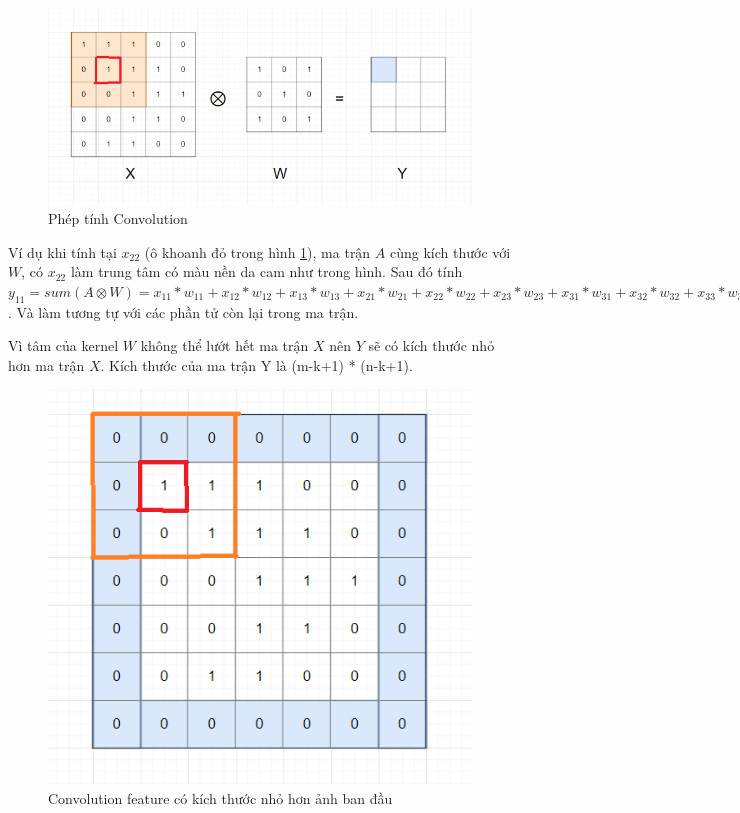 \FloatBarrier
\begin{figure}[htp]
\begin{center}
\includegraphics[scale=0.65]{chap2/c2_figs/9.png}
\end{center}
\caption{Phép tính Convolution}
\label{fig:convolution}
\end{figure}
\FloatBarrier

Ví dụ khi tính tại $x_{22}$ (ô khoanh đỏ trong hình \ref{fig:convolution}), ma trận $A$ cùng kích thước với $W$, có $x_{22}$ làm trung tâm có màu nền da cam như trong hình. Sau đó tính $y_{11} = sum(A \otimes W) = x_{11}*w_{11} + x_{12}*w_{12} + x_{13}*w_{13} + x_{21}*w_{21} + x_{22}*w_{22} + x_{23}*w_{23} + x_{31}*w_{31} + x_{32}*w_{32} + x_{33}*w_{33} = 4$. Và làm tương tự với các phần tử còn lại trong ma trận.

Vì tâm của kernel $W$ không thể lướt hết ma trận $X$ nên $Y$ sẽ có kích thước nhỏ hơn ma trận $X$. Kích thước của ma trận Y là (m-k+1) * (n-k+1).

\FloatBarrier
\begin{figure}[htp]
\begin{center}
\includegraphics[scale=0.65]{chap2/c2_figs/10.png}
\end{center}
\caption{Convolution feature có kích thước nhỏ hơn ảnh ban đầu}
\label{fig:convolution-feature}
\end{figure}
\FloatBarrier

